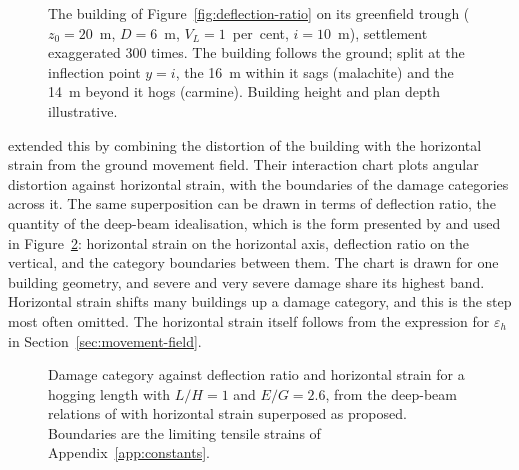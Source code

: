 \begin{figure}[htbp]
\centering
{}
\caption{The building of Figure~\ref{fig:deflection-ratio} on its greenfield trough ($z_0 = 20$~m, $D = 6$~m, $V_L = 1$~per~cent, $i = 10$~m), settlement exaggerated 300 times. The building follows the ground; split at the inflection point $y = i$, the 16~m within it sags (malachite) and the 14~m beyond it hogs (carmine). Building height and plan depth illustrative.}
\label{fig:r3d-building-trough}
\end{figure}

\citet{boscardin1989building} extended this by combining the distortion of the
building with the
horizontal strain from the ground movement field. Their interaction chart
plots angular distortion against horizontal strain, with the boundaries of the
damage categories across it. The same superposition can be drawn in terms of
deflection ratio, the quantity of the deep-beam idealisation, which is the form
presented by \citet{mair1996subsurface} and used in
Figure~\ref{fig:damage-interaction}: horizontal strain on the horizontal axis,
deflection ratio on the vertical, and the category boundaries between them.
The chart is drawn for one building geometry, and severe and very severe
damage share its highest band. Horizontal strain shifts many
buildings up a damage category, and this is the step most often omitted.
The horizontal strain itself follows from the expression for
$\varepsilon_h$ in Section~\ref{sec:movement-field}.

\begin{figure}[htbp]
\centering
{}
\caption{Damage category against deflection ratio and horizontal strain for a hogging length with $L/H = 1$ and $E/G = 2.6$, from the deep-beam relations of \citet{burland1974settlement} with horizontal strain superposed as \citet{boscardin1989building} proposed. Boundaries are the limiting tensile strains of Appendix~\ref{app:constants}.}
\label{fig:damage-interaction}
\end{figure}

